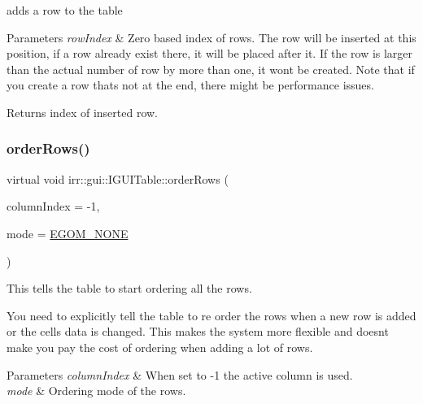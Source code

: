 adds a row to the table 


\begin{DoxyParams}{Parameters}
{\em row\+Index} & Zero based index of rows. The row will be inserted at this position, if a row already exist there, it will be placed after it. If the row is larger than the actual number of row by more than one, it won\textquotesingle{}t be created. Note that if you create a row that\textquotesingle{}s not at the end, there might be performance issues. \\
\hline
\end{DoxyParams}
\begin{DoxyReturn}{Returns}
index of inserted row. 
\end{DoxyReturn}
\mbox{\label{classirr_1_1gui_1_1IGUITable_a22ec8c1ee8e6a191b8bdcd741b0144f2}} 
\subsubsection{\texorpdfstring{order\+Rows()}{orderRows()}\hspace{0.1cm}{\footnotesize\ttfamily [1/2]}}
{\footnotesize\ttfamily virtual void irr\+::gui\+::\+I\+G\+U\+I\+Table\+::order\+Rows (\begin{DoxyParamCaption}\item[{\hyperlink{namespaceirr_ac66849b7a6ed16e30ebede579f9b47c6}{s32}}]{column\+Index = {\ttfamily -\/1},  }\item[{\hyperlink{namespaceirr_1_1gui_a577bf3aa30c2e3bde9aa3eaa2e4f16d3}{E\+G\+U\+I\+\_\+\+O\+R\+D\+E\+R\+I\+N\+G\+\_\+\+M\+O\+DE}}]{mode = {\ttfamily \hyperlink{namespaceirr_1_1gui_a577bf3aa30c2e3bde9aa3eaa2e4f16d3afc9617a9d7600ff2bea753c6fe060ad0}{E\+G\+O\+M\+\_\+\+N\+O\+NE}} }\end{DoxyParamCaption})\hspace{0.3cm}{\ttfamily [pure virtual]}}



This tells the table to start ordering all the rows. 

You need to explicitly tell the table to re order the rows when a new row is added or the cells data is changed. This makes the system more flexible and doesn\textquotesingle{}t make you pay the cost of ordering when adding a lot of rows. 
\begin{DoxyParams}{Parameters}
{\em column\+Index} & When set to -\/1 the active column is used. \\
\hline
{\em mode} & Ordering mode of the rows. \\
\hline
\end{DoxyParams}
\mbox{\label{classirr_1_1gui_1_1IGUITable_a22ec8c1ee8e6a191b8bdcd741b0144f2}} 
